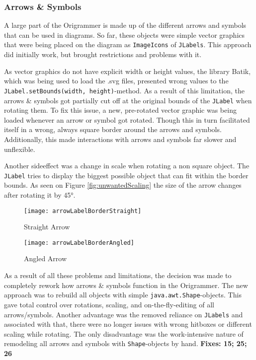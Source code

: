 \subsubsection{Arrows \& Symbols}
A large part of the Origrammer is made up of the different arrows and symbols that can be used in diagrams. So far, these objects were simple vector graphics that were being placed on the diagram as \texttt{ImageIcons} of \texttt{JLabels}. This approach did initially work, but brought restrictions and problems with it.

 As vector graphics do not have explicit width or height values, the library Batik\cite{batik}, which was being used to load the .svg files, presented wrong values to the \texttt{JLabel.setBounds(width, height)}-method. As a result of this limitation, the arrows \& symbols got partially cut off at the original bounds of the \texttt{JLabel} when rotating them. To fix this issue, a new, pre-rotated vector graphic was being loaded whenever an arrow or symbol got rotated. Though this in turn facilitated itself in a wrong, always square border around the arrows and symbols. Additionally, this made interactions with arrows and symbols far slower and unflexible.
 
 Another sideeffect was a change in scale when rotating a non square object. The \texttt{JLabel} tries to display the biggest possible object that can fit within the border bounds. As seen on Figure \ref{fig:unwantedScaling} the size of the arrow changes after rotating it by 45°.

\begin{figure*}[htbp]
	\centering
	\begin{subfigure}{0.3\textwidth}
		\texttt{[image: arrowLabelBorderStraight]}
		\caption{Straight Arrow}
		\label{fig:arrowLabelBorderStraight}
	\end{subfigure}
	\begin{subfigure}{0.3\textwidth}
		\texttt{[image: arrowLabelBorderAngled]}
		\caption{Angled Arrow}
		\label{fig:arrowLabelBorderAngled}
	\end{subfigure}
	\caption{Unwanted Scaling when Rotating}
	\label{fig:unwantedScaling}
\end{figure*}

As a result of all these problems and limitations, the decision was made to completely rework how arrows \& symbols function in the Origrammer. The new approach was to rebuild all objects with simple \texttt{java.awt.Shape}-objects. This gave total control over rotations, scaling, and on-the-fly-editing of all arrows/symbols. Another advantage was the removed reliance on \texttt{JLabels} and associated with that, there were no longer issues with wrong hitboxes or different scaling while rotating. The only disadvantage was the work-intensive nature of remodeling all arrows and symbols with \texttt{Shape}-objects by hand.
\newline
\textbf{Fixes: 15; 25; 26}

